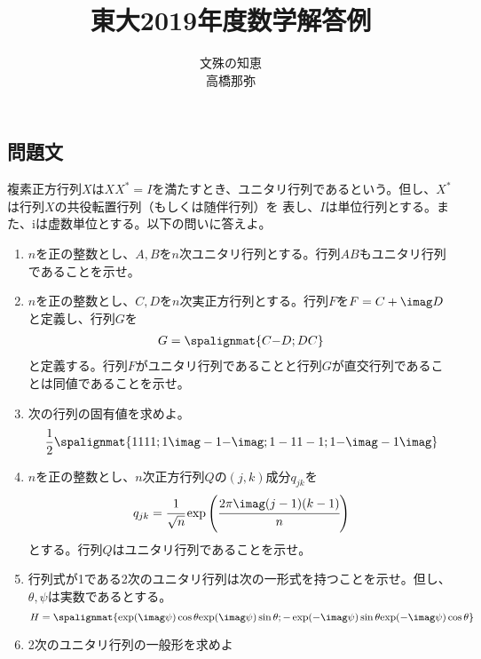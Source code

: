 \documentclass[dvipdfmx,titlepage, 11pt, a4paper]{jsarticle}%
\title{\Huge 東大2019年度数学解答例\\[10mm]}
\author{{\LARGE 文殊の知恵}\\[1mm]\LARGE 高橋那弥}
\date{}
\begin{document}
\maketitle
\tableofcontents %
\newpage
\setcounter{tocdepth}{3}%
\section{}%
\subsection{問題文}
複素正方行列$X$は$XX^{\ast}=I$を満たすとき、ユニタリ行列であるという。但し、$X^{\ast}$は行列$X$の共役転置行列（もしくは随伴行列）を
表し、$I$は単位行列とする。また、iは虚数単位とする。以下の問いに答えよ。
\begin{enumerate}[(1)]
    \setlength{\itemsep}{10pt}
    \item $n$を正の整数とし、$A, B$を$n$次ユニタリ行列とする。行列$AB$もユニタリ行列であることを示せ。
    \item $n$を正の整数とし、$C, D$を$n$次実正方行列とする。行列$F$を$F = C + \imag D$と定義し、行列$G$を
    \begin{align*}
        G = \spalignmat{
            C {-D};
            D {C}
        }
    \end{align*}
    と定義する。行列$F$がユニタリ行列であることと行列$G$が直交行列であることは同値であることを示せ。
    \item 次の行列の固有値を求めよ。
    \begin{align*}
        \frac{1}{2}\spalignmat{
            1 1 1 1;
            1 {\imag} -1 {-\imag};
            1 -1 1 -1;
            1 {-\imag} -1 {\imag}
        }
    \end{align*}
    \item $n$を正の整数とし、$n$次正方行列$Q$の$(j, k)$成分$q_{jk}$を
    \begin{equation*}
        q_{jk} = \cfrac{1}{\sqrt{n}}\exp \left(\cfrac{2\pi\imag (j - 1)(k - 1)}{n}\right)
    \end{equation*}
    とする。行列$Q$はユニタリ行列であることを示せ。
    \item 行列式が1である2次のユニタリ行列は次の一形式を持つことを示せ。但し、$\theta, \psi$は実数であるとする。
    \begin{equation*}
        H = \spalignmat{
            {\exp(\imag \psi)\cos\theta} {\exp(\imag \psi)\sin\theta};
            {-\exp(-\imag \psi)\sin\theta} {\exp(-\imag \psi)\cos\theta}
        }
    \end{equation*}
    \item 2次のユニタリ行列の一般形を求めよ
\end{enumerate}
\end{document}
